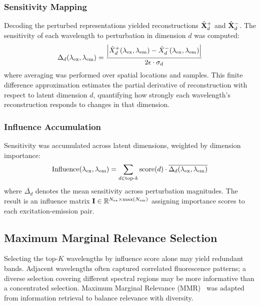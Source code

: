 \subsubsection{Sensitivity Mapping}
Decoding the perturbed representations yielded reconstructions $\hat{\mathbf{X}}^{+}_d$ and $\hat{\mathbf{X}}^{-}_d$.
The sensitivity of each wavelength to perturbation in dimension $d$ was computed:
\begin{equation}
\Delta_d(\lambda_{\text{ex}}, \lambda_{\text{em}}) = \frac{\left| \hat{X}^{+}_d(\lambda_{\text{ex}}, \lambda_{\text{em}}) - \hat{X}^{-}_d(\lambda_{\text{ex}}, \lambda_{\text{em}}) \right|}{2\epsilon \cdot \sigma_d}
\label{eq:sensitivity}
\end{equation}
where averaging was performed over spatial locations and samples.
This finite difference approximation estimates the partial derivative of reconstruction with respect to latent dimension $d$, quantifying how strongly each wavelength's reconstruction responds to changes in that dimension.

\subsubsection{Influence Accumulation}
Sensitivity was accumulated across latent dimensions, weighted by dimension importance:
\begin{equation}
\text{Influence}(\lambda_{\text{ex}}, \lambda_{\text{em}}) = \sum_{d \in \text{top-}k} \text{score}(d) \cdot \overline{\Delta_d(\lambda_{\text{ex}}, \lambda_{\text{em}})}
\label{eq:influence}
\end{equation}
where $\overline{\Delta_d}$ denotes the mean sensitivity across perturbation magnitudes.
The result is an influence matrix $\mathbf{I} \in \mathbb{R}^{N_{\text{ex}} \times \max(N_{\text{em}})}$ assigning importance scores to each excitation-emission pair.

\subsection{Maximum Marginal Relevance Selection}
\label{sec:mmr}

Selecting the top-$K$ wavelengths by influence score alone may yield redundant bands.
Adjacent wavelengths often captured correlated fluorescence patterns; a diverse selection covering different spectral regions may be more informative than a concentrated selection.
Maximum Marginal Relevance (MMR)~\cite{carbonell1998use} was adapted from information retrieval to balance relevance with diversity.

